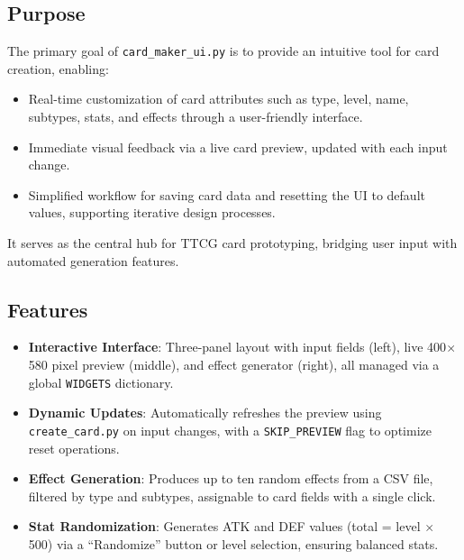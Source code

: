 \subsection{Purpose}
The primary goal of \texttt{card\_maker\_ui.py} is to provide an intuitive tool for card creation, enabling:
\begin{itemize}
	\item Real-time customization of card attributes such as type, level, name, subtypes, stats, and effects through a user-friendly interface.
	\item Immediate visual feedback via a live card preview, updated with each input change.
	\item Simplified workflow for saving card data and resetting the UI to default values, supporting iterative design processes.
\end{itemize}
It serves as the central hub for TTCG card prototyping, bridging user input with automated generation features.

\subsection{Features}
\begin{itemize}
	\item \textbf{Interactive Interface}: Three-panel layout with input fields (left), live 400$\times$580 pixel preview (middle), and effect generator (right), all managed via a global \texttt{WIDGETS} dictionary.
	\item \textbf{Dynamic Updates}: Automatically refreshes the preview using \texttt{create\_card.py} on input changes, with a \texttt{SKIP\_PREVIEW} flag to optimize reset operations.
	\item \textbf{Effect Generation}: Produces up to ten random effects from a CSV file, filtered by type and subtypes, assignable to card fields with a single click.
	\item \textbf{Stat Randomization}: Generates ATK and DEF values (total = level $\times$ 500) via a ``Randomize'' button or level selection, ensuring balanced stats.
\end{itemize}

